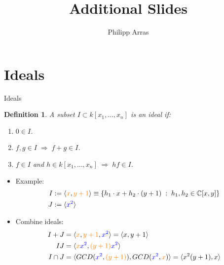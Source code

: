 \documentclass[notes=hide]{beamer}
\author{Philipp Arras}
\title{Additional Slides}
\institute{Institute for Theoretical Physics Heidelberg}
\newtheorem{defn}{Definition}
\newcommand{\C}{\mathbb{C}}
\newcommand{\mvar}[2]{#1_1,\ldots , #1_{#2}}
\begin{document}
\begin{frame}
\titlepage
\end{frame}

\section{Ideals}

\begin{frame}{Ideals} \small
\begin{defn}
A subset $I\subset k[\mvar{x}{n}]$ is an \emph{ideal} if:
\begin{enumerate}
\item $0 \in I$.
\item $f,g\in I \;\Rightarrow \; f+g\in I$.
\item $f\in I$ and $h\in k[\mvar{x}{n}] \;\Rightarrow\; hf\in I$.
\end{enumerate}
\end{defn}
\pause
\begin{itemize}[<+->]
\item Example: \begin{align*}
	I &:= \langle \textcolor{orange}{x},\textcolor{orange}{y+1} \rangle \equiv \{ h_1 \cdot x + h_2 \cdot (y+1) \; : \; h_1,h_2 \in \C [x,y] \}\\
	J &:= \langle \textcolor{blue}{x^2} \rangle
	\end{align*}
\item Combine ideals: \begin{align*}
I+J &= \langle \textcolor{orange}{x},\textcolor{orange}{y+1},\textcolor{blue}{x^2} \rangle = \langle x,y+1 \rangle\\
IJ &= \langle \textcolor{orange}{x}\textcolor{blue}{x^2} , \textcolor{orange}{(y+1)}\textcolor{blue}{x^2}  \rangle\\
I\cap J &= \langle GCD (\textcolor{blue}{x^2},\textcolor{orange}{(y+1)}), GCD(\textcolor{blue}{x^2},\textcolor{orange}{x}) \rangle = \langle x^2(y+1),x \rangle
\end{align*}

\end{itemize}
\end{frame}
\end{document}
